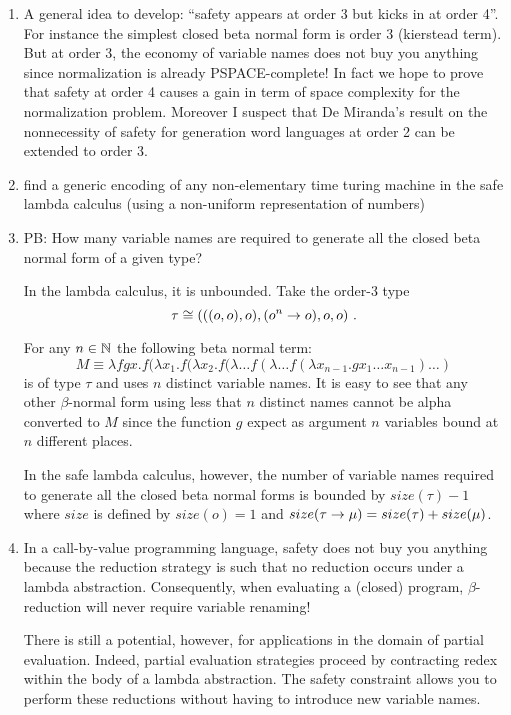\documentclass{article}
\begin{document}
\begin{enumerate}

\item A general idea to develop: ``safety appears at order 3 but kicks in at order 4''. For instance the simplest closed beta normal form is order 3 (kierstead term). But at order 3, the economy of variable names does not buy you anything since normalization is already PSPACE-complete! In fact we hope to prove that safety at order 4 causes a gain in term of space complexity for the normalization problem.
    Moreover I suspect that De Miranda's result on the nonnecessity of safety for generation word languages at order 2 can be extended to order 3.


\item find a generic encoding of any non-elementary time turing machine
in the safe lambda calculus (using a non-uniform representation of
numbers)


\item \label{safe_varnames} PB: How many variable names are required to generate all the
closed beta normal form of a given type?

In the lambda calculus, it is unbounded. Take the order-3 type
$$\tau
\cong (((o,o),o), (o^n\rightarrow o), o, o) \ . $$

For any $n\in\mathbb{N}$ the following beta normal term:
$$ M \equiv \lambda f g x . f (\lambda x_1.f(\lambda x_2.f(\lambda \ldots f(\lambda \ldots f(\lambda x_{n-1}.g x_1 \ldots x_{n-1}) \ldots )$$
is of type $\tau$ and uses $n$ distinct variable names. It is easy to see that
any other $\beta$-normal form using less that $n$ distinct names cannot be alpha converted to $M$
since the function $g$ expect as argument $n$ variables bound at $n$ different places.


In the safe lambda calculus, however, the number of variable names
required to generate all the closed beta normal forms is bounded by
$size(\tau)-1$ where $size$ is defined by $size(o)= 1$ and
$size(\tau\rightarrow\mu) = size(\tau) + size(\mu)$.


\item In a call-by-value programming language, safety does not buy you anything because the reduction strategy is such that no reduction occurs under a lambda abstraction. Consequently, when evaluating a (closed) program, $\beta$-reduction will never require variable renaming!

    There is still a potential, however, for applications in the domain of partial evaluation. Indeed, partial evaluation strategies proceed by contracting redex within the body of a lambda abstraction. The safety constraint allows you to perform these reductions without having to introduce new variable names.
\end{enumerate}
\end{document}
